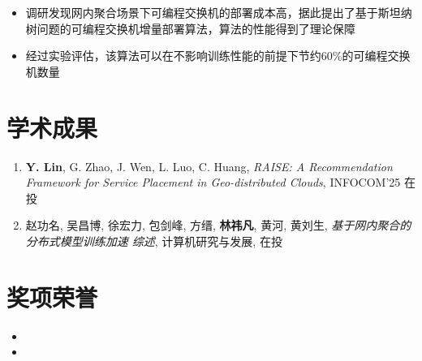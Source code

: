 \documentclass{resume}
\begin{document}
\begin{itemize}[parsep=0.5ex]
  \item 调研发现网内聚合场景下可编程交换机的部署成本高，据此提出了基于斯坦纳树问题的可编程交换机增量部署算法，算法的性能得到了理论保障
  \item 经过实验评估，该算法可以在不影响训练性能的前提下节约60\%的可编程交换机数量
\end{itemize}

\section{学术成果}

\begin{enumerate}[parsep=0.5ex]
  \item \textbf{Y. Lin}, G. Zhao, J. Wen, L. Luo, C. Huang, \textit{RAISE: A Recommendation Framework for Service Placement in Geo-distributed Clouds}, INFOCOM'25 在投
  \item 赵功名, 吴昌博, 徐宏力, 包剑峰, 方缙, \textbf{林祎凡}, 黄河, 黄刘生, \textit{基于网内聚合的分布式模型训练加速
  综述}, 计算机研究与发展, 在投
\end{enumerate}

\section{奖项荣誉}

\begin{itemize}[parsep=0.5ex]
  \item {}
  \item {}
\end{itemize}
\end{document}
